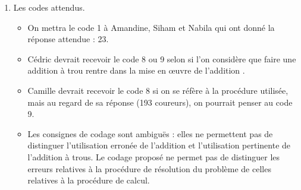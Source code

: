 \begin{corrige}
\begin{enumerate}
\begin{enumerate}
   \item {\bf Erreur d'Houssan :} on peut envisager deux hypothèses principales :
  \begin{itemize}
   \item dans chaque colonne, il calcule l'écart entre le plus grand et le plus petit chiffre : $8-5= 3$ , $8-0= 8$ et $1-0= 1$ ;
   \item au lieu de soustraire, il additionne 108 et 85 et oublie la retenue.
   \end{itemize}   
   {\bf Erreur de Benyamine :} pas de problème apparent pour les unités. Pour la suite du calcul, il est difficile de recréer la chronologie. Ne pouvant ôter 8 de 0, il ôte 8 de 10 et place le 1 en bas (conservation des écarts). \\
   La présence du 7 indique très vraisemblablement qu'il a retranché 1 de 8 pour obtenir le 7. Mais ce 1 n'est pas le 1 entouré du bas, puisqu'il trouve 33 et non 133. Il semble donc que le 1 ajouté en haut soit traité doublement : pour la conservation des écarts d'abord, mais aussi par retrait au terme du bas.
   \end{enumerate}
   \setcounter{enumi}{3} 
   \item Les codes attendus.
   \begin{itemize}
      \item On mettra le code 1 à Amandine, Siham et Nabila qui ont donné la réponse attendue : 23.
      \item Cédric devrait recevoir le code 8 ou 9 selon si l'on considère que faire une addition à trou rentre dans la \og mise en \oe uvre de l'addition \fg.
      \item Camille devrait recevoir le code 8 si on se réfère à la procédure utilisée, mais au regard de sa réponse (193 coureurs), on pourrait penser au code 9.
      \item Les consignes de codage sont ambiguës : elles ne permettent pas de distinguer l'utilisation erronée de l'addition et l'utilisation pertinente de l'addition à trous. Le codage proposé ne permet pas de distinguer les erreurs relatives à la procédure de résolution du problème de celles relatives à la procédure de calcul. \\
   \end{itemize}
\end{enumerate}
\end{corrige}

\pagebreak


